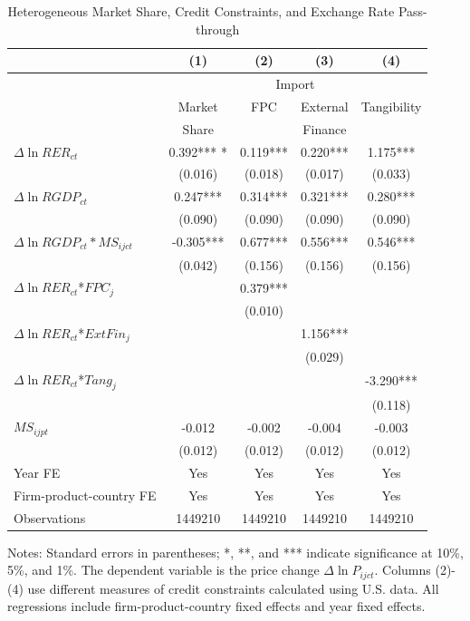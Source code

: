 \documentclass[12pt]{article}
\begin{document}
\begin{table}[htbp]
	\centering
	\caption{Heterogeneous Market Share, Credit Constraints, and Exchange Rate Pass-through}
	\begin{threeparttable}
		\begin{tabular}{lcccc}
			\toprule
			& (1)   & (2)   & (3)   & (4) \\
			\midrule
			& \multicolumn{4}{c}{Import} \\
			& Market    &  FPC & External & Tangibility\\
			& Share       &       & Finance  & \\
			\midrule
			$\Delta \ln RER_{ct}$ & 0.392*** * & 0.119*** & 0.220*** & 1.175*** \\
			& (0.016)  & (0.018) & (0.017) & (0.033) \\
			$\Delta \ln RGDP_{ct}$ & 0.247***  & 0.314*** & 0.321*** & 0.280*** \\
			& (0.090)  & (0.090) & (0.090) & (0.090) \\
			$\Delta \ln RGDP_{ct}*MS_{ijct}$ & -0.305***  & 0.677*** & 0.556*** & 0.546*** \\
			& (0.042)  & (0.156) & (0.156) & (0.156) \\
			$\Delta \ln RER_{ct}$*$FPC_{j}$ &   & 0.379*** &       &  \\
			&       & (0.010) &       &  \\
			$\Delta \ln RER_{ct}$*$ExtFin_{j}$ &       &       & 1.156*** &  \\
			&      &       & (0.029) &  \\
			$\Delta \ln RER_{ct}$*$Tang_{j}$ &       &       &       & -3.290*** \\
			&       &       &       & (0.118) \\
			$MS_{ijpt}$    & -0.012 & -0.002 & -0.004 & -0.003 \\
			& (0.012)  & (0.012) & (0.012) & (0.012) \\
			Year FE  & Yes  & Yes   & Yes   & Yes \\
			Firm-product-country FE & Yes    & Yes   & Yes   & Yes \\
			Observations & 1449210  & 1449210 & 1449210 & 1449210 \\
			\bottomrule
		\end{tabular}
		\begin{tablenotes}
			\footnotesize
			\item[Notes:] Standard errors in parentheses; *, **, and *** indicate significance at 10\%, 5\%, and 1\%. The dependent variable is the price change $\Delta \ln P_{ijct}$. Columns (2)-(4) use different measures of credit constraints calculated using U.S. data. All regressions include firm-product-country fixed effects and year fixed effects.
		\end{tablenotes}
	\end{threeparttable}
	\label{tab.share}
\end{table}
\end{document}
